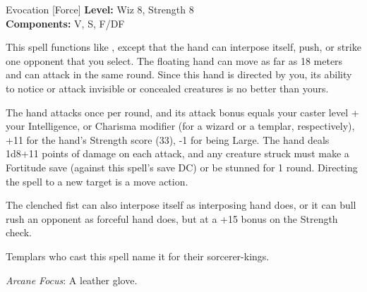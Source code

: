 {Evocation [Force]}
{
	\textbf{Level:}
	Wiz 8, Strength 8\\
	\textbf{Components:}
	V, S, F/DF\\
}
{
	This spell functions like , except that the hand can interpose itself, push, or strike one opponent that you select. The floating hand can move as far as 18 meters and can attack in the same round. Since this hand is directed by you, its ability to notice or attack invisible or concealed creatures is no better than yours.

	The hand attacks once per round, and its attack bonus equals your caster level + your Intelligence, or Charisma modifier (for a wizard or a templar, respectively), +11 for the hand's Strength score (33), -1 for being Large. The hand deals 1d8+11 points of damage on each attack, and any creature struck must make a Fortitude save (against this spell's save DC) or be stunned for 1 round. Directing the spell to a new target is a move action.

	The clenched fist can also interpose itself as interposing hand does, or it can bull rush an opponent as forceful hand does, but at a +15 bonus on the Strength check.

	Templars who cast this spell name it for their sorcerer-kings.

	\textit{Arcane Focus}:
	A leather glove.

}

